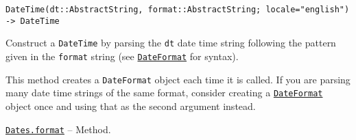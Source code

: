\begin{adjustwidth}{2em}{0pt}


\begin{verbatim}
DateTime(dt::AbstractString, format::AbstractString; locale="english") -> DateTime
\end{verbatim}

Construct a \texttt{DateTime} by parsing the \texttt{dt} date time string following the pattern given in the \texttt{format} string (see \hyperlink{18093459443158853001}{\texttt{DateFormat}}  for syntax).

This method creates a \texttt{DateFormat} object each time it is called. If you are parsing many date time strings of the same format, consider creating a \hyperlink{18093459443158853001}{\texttt{DateFormat}} object once and using that as the second argument instead.



\end{adjustwidth}
\hypertarget{10034586459080834693}{}
\hyperlink{10034586459080834693}{\texttt{Dates.format}}  -- {Method.}

